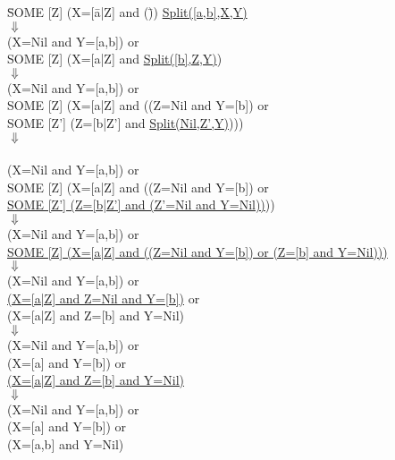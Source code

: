 \begin{ttfamily}
\small
\begin{tabbing}
\hspace*{1cm}\=SOME [Z] (X=[\= a|Z] and (\=))\kill
\>\underline{Split([a,b],X,Y)}\\
\>\>$\Downarrow$\\
\>(X=Nil and Y=[a,b]) or\\
\>SOME [Z] (X=[a|Z] and \underline{Split([b],Z,Y)})\\
\>\>$\Downarrow$\\
\>(X=Nil and Y=[a,b]) or\\
\>SOME [Z] (X=[a|Z] and ((Z=Nil and Y=[b]) or\\
\>\>\>SOME [Z'] (Z=[b|Z'] and \underline{Split(Nil,Z',Y)})))\\
\>\>$\Downarrow$\\
\pagebreak                      %
\\
\>(X=Nil and Y=[a,b]) or\\
\>SOME [Z] (X=[a|Z] and ((Z=Nil and Y=[b]) or\\
\>\>\>\underline{SOME [Z'] (Z=[b|Z'] and (Z'=Nil and Y=Nil))}))\\
\>\>$\Downarrow$\\
\>(X=Nil and Y=[a,b]) or\\
\>\underline{SOME [Z] (X=[a|Z] and ((Z=Nil and Y=[b]) or (Z=[b] and Y=Nil)))}\\
\>\>$\Downarrow$\\
\>(X=Nil and Y=[a,b]) or\\
\>\underline{(X=[a|Z] and Z=Nil and Y=[b])} or\\
\>(X=[a|Z] and Z=[b] and Y=Nil)\\
\>\>$\Downarrow$\\
\>(X=Nil and Y=[a,b]) or\\
\>(X=[a] and Y=[b]) or\\
\>\underline{(X=[a|Z] and Z=[b] and Y=Nil)}\\
\>\>$\Downarrow$\\
\>(X=Nil and Y=[a,b]) or\\
\>(X=[a] and Y=[b]) or\\
\>(X=[a,b] and Y=Nil)\\
\end{tabbing}
\end{ttfamily}

